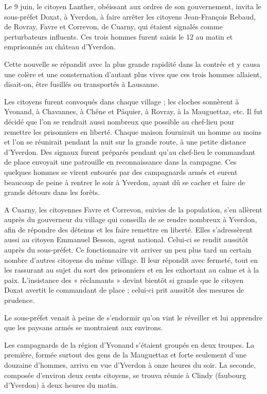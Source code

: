 \documentclass[french,twoside]{book} %
\begin{document}
\noindent Le 9 juin, le citoyen Lanther, obéissant aux ordres de son gouvernement, invita le sous-préfet Doxat, à Yverdon, à faire arrêter les citoyens Jean-François Rebaud, de Rovray, Favre et Correvon, de Cuarny, qui étaient signalés comme perturbateurs influents. Ces trois hommes furent saisis le 12 au matin et emprisonnés au château d’Yverdon.\par
Cette nouvelle se répandit avec la plus grande rapidité dans la contrée et y causa une colère et une consternation d’autant plus vives que ces trois hommes allaient, disait-on, être fusillés ou transportés à Lausanne.\par
Les citoyens furent convoqués dans chaque village ; les cloches sonnèrent à Yvonand, à Chavannes, à Chêne et Pâquier, à Rovray, à la Mauguettaz, etc. Il fut décidé que l’on se rendrait aussi nombreux que possible au chef-lieu pour remettre les prisonniers en liberté. Chaque maison fournirait un homme au moins et l’on se réunirait pendant la nuit sur la grande route, à une petite distance d’Yverdon. Des signaux furent préparés pendant qu’au chef-lieu le commandant de place envoyait une patrouille en reconnaissance dans la campagne. Ces quelques hommes se virent entourés par des campagnards armés et eurent beaucoup de peine à rentrer le soir à Yverdon, ayant dû se cacher et faire de grands détours dans les forêts.\par
A Cuarny, les citoyennes Favre et Correvon, suivies de la population, s’en allèrent auprès du gouverneur du village qui conseilla de se rendre nombreux à Yverdon, afin de répondre des détenus et les faire remettre en liberté. Elles s’adressèrent aussi au citoyen Emmanuel Besson, agent national. Celui-ci se rendit aussitôt auprès du sous-préfet. Ce fonctionnaire vit arriver un peu plus tard un certain nombre d’autres citoyens du même village. Il leur répondit avec fermeté, tout en les rassurant au sujet du sort des prisonniers et en les exhortant au calme et à la paix. L’insistance des « réclamants » devint bientôt si grande que le citoyen Doxat avertit le commandant de place ; celui-ci prit aussitôt des mesures de prudence.\par
Le sous-préfet venait à peine de s’endormir qu’on vint le réveiller et lui apprendre que les paysans armés se montraient aux environs.\par
Les campagnards de la région d’Yvonand s’étaient groupés en deux troupes. La première, formée surtout des gens de la Mauguettaz et forte seulement d’une douzaine d’hommes, arriva en vue d’Yverdon à onze heures du soir. La seconde, composée d’environ deux cents citoyens, se trouva réunie à Clindy (faubourg d’Yverdon) à deux heures du matin.\par
\end{document}
